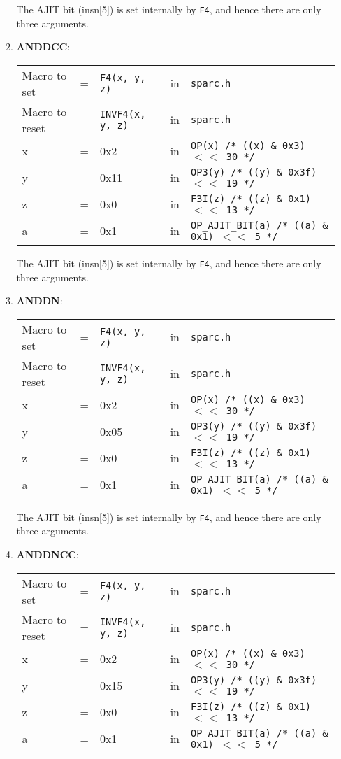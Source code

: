 \begin{itemize}
\begin{enumerate}
    The AJIT bit  (insn[5]) is set internally by  \texttt{F4}, and hence
    there are only three arguments.

  \item \textbf{ANDDCC}:\\
    \begin{tabular}[h]{lclcl}
      Macro to set  &=& \texttt{F4(x, y, z)} &in& \texttt{sparc.h}     \\
      Macro to reset  &=& \texttt{INVF4(x, y, z)} &in& \texttt{sparc.h}     \\
      x &=& 0x2      &in& \texttt{OP(x)  /* ((x) \& 0x3)  $<<$ 30 */} \\
      y &=& 0x11     &in& \texttt{OP3(y) /* ((y) \& 0x3f) $<<$ 19 */} \\
      z &=& 0x0      &in& \texttt{F3I(z) /* ((z) \& 0x1)  $<<$ 13 */} \\
      a &=& 0x1      &in& \texttt{OP\_AJIT\_BIT(a) /* ((a) \& 0x1)  $<<$ 5 */}
    \end{tabular}

    The AJIT bit  (insn[5]) is set internally by  \texttt{F4}, and hence
    there are only three arguments.

  \item \textbf{ANDDN}:\\
    \begin{tabular}[h]{lclcl}
      Macro to set  &=& \texttt{F4(x, y, z)} &in& \texttt{sparc.h}     \\
      Macro to reset  &=& \texttt{INVF4(x, y, z)} &in& \texttt{sparc.h}     \\
      x &=& 0x2      &in& \texttt{OP(x)  /* ((x) \& 0x3)  $<<$ 30 */} \\
      y &=& 0x05     &in& \texttt{OP3(y) /* ((y) \& 0x3f) $<<$ 19 */} \\
      z &=& 0x0      &in& \texttt{F3I(z) /* ((z) \& 0x1)  $<<$ 13 */} \\
      a &=& 0x1      &in& \texttt{OP\_AJIT\_BIT(a) /* ((a) \& 0x1)  $<<$ 5 */}
    \end{tabular}

    The AJIT bit  (insn[5]) is set internally by  \texttt{F4}, and hence
    there are only three arguments.

  \item \textbf{ANDDNCC}:\\
    \begin{tabular}[h]{lclcl}
      Macro to set  &=& \texttt{F4(x, y, z)} &in& \texttt{sparc.h}     \\
      Macro to reset  &=& \texttt{INVF4(x, y, z)} &in& \texttt{sparc.h}     \\
      x &=& 0x2      &in& \texttt{OP(x)  /* ((x) \& 0x3)  $<<$ 30 */} \\
      y &=& 0x15     &in& \texttt{OP3(y) /* ((y) \& 0x3f) $<<$ 19 */} \\
      z &=& 0x0      &in& \texttt{F3I(z) /* ((z) \& 0x1)  $<<$ 13 */} \\
      a &=& 0x1      &in& \texttt{OP\_AJIT\_BIT(a) /* ((a) \& 0x1)  $<<$ 5 */}
    \end{tabular}


\end{enumerate}
\end{itemize}
